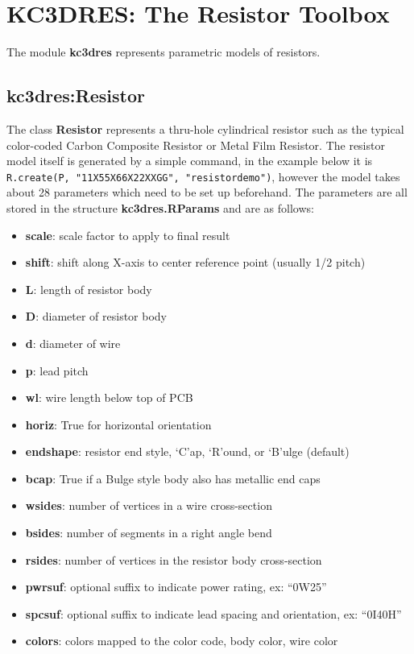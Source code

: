 \section{KC3DRES: The Resistor Toolbox}
The module \textbf{kc3dres} represents parametric models of resistors. 

\subsection{kc3dres:Resistor}
The class \textbf{Resistor} represents a thru-hole cylindrical resistor such as
the typical color-coded Carbon Composite Resistor or Metal Film Resistor. The
resistor model itself is generated by a simple command, in the example below it is
\verb#R.create(P, "11X55X66X22XXGG", "resistordemo")#, however the model takes
about 28 parameters which need to be set up beforehand.  The parameters are all
stored in the structure \textbf{kc3dres.RParams} and are as follows:

\begin{itemize}
\item\textbf{scale}: scale factor to apply to final result
\item\textbf{shift}: shift along X-axis to center reference point (usually 1/2 pitch)
\item\textbf{L}: length of resistor body
\item\textbf{D}: diameter of resistor body
\item\textbf{d}: diameter of wire
\item\textbf{p}: lead pitch
\item\textbf{wl}: wire length below top of PCB
\item\textbf{horiz}: True for horizontal orientation
\item\textbf{endshape}: resistor end style, `C'ap, `R'ound, or `B'ulge (default)
\item\textbf{bcap}: True if a Bulge style body also has metallic end caps
\item\textbf{wsides}: number of vertices in a wire cross-section
\item\textbf{bsides}: number of segments in a right angle bend
\item\textbf{rsides}: number of vertices in the resistor body cross-section
\item\textbf{pwrsuf}: optional suffix to indicate power rating, ex: ``0W25''
\item\textbf{spcsuf}: optional suffix to indicate lead spacing and orientation, ex: ``0I40H''
\item\textbf{colors}: colors mapped to the color code, body color, wire color
\end{itemize}

